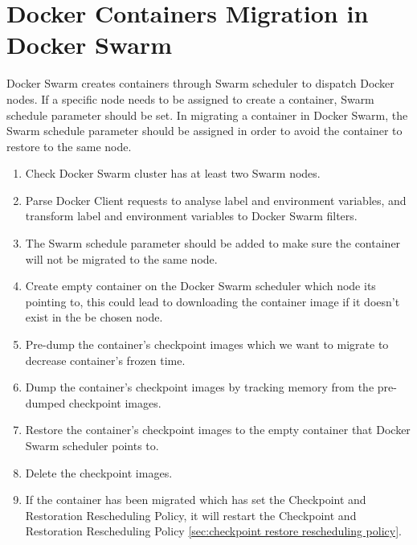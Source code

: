 \section{Docker Containers Migration in Docker Swarm}
Docker Swarm creates containers through Swarm scheduler to dispatch Docker nodes. If a specific node needs to be assigned to create a container, Swarm schedule parameter should be set.
In migrating a container in Docker Swarm, the Swarm schedule parameter should be assigned in order to avoid the container to restore to the same node.
\begin{enumerate}[Step 1.]
	\item Check Docker Swarm cluster has at least two Swarm nodes.
    \item Parse Docker Client requests to analyse label and environment variables, and transform label and environment variables to Docker Swarm filters.
    \item The Swarm schedule parameter should be added to make sure the container will not be migrated to the same node.
    \item Create empty container on the Docker Swarm scheduler which node its pointing to, this could lead to downloading the container image if it doesn't exist in the be chosen node.
    \item Pre-dump the container's checkpoint images which we want to migrate to decrease container's frozen time.
    \item Dump the container's checkpoint images by tracking memory from the pre-dumped checkpoint images.
    \item Restore the container's checkpoint images to the empty container that Docker Swarm scheduler points to.
    \item Delete the checkpoint images.
    \item If the container has been migrated which has set the Checkpoint and Restoration Rescheduling Policy, it will restart the Checkpoint and Restoration Rescheduling Policy \ref{sec:checkpoint restore rescheduling policy}.
\end{enumerate}
%
%

